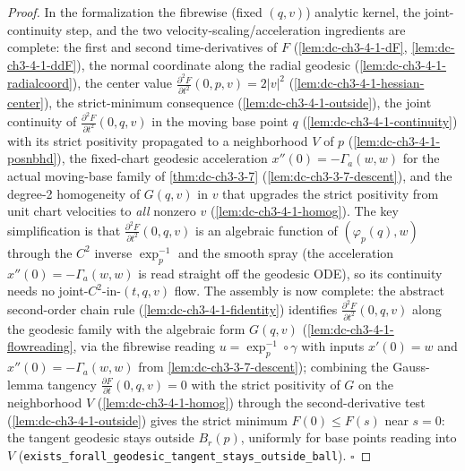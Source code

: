 \begin{proof}
  In the formalization the fibrewise (fixed $(q,v)$) analytic kernel, the
  joint-continuity step, and the two velocity-scaling/acceleration ingredients are
  complete: the first and second time-derivatives of $F$
  (\cref{lem:dc-ch3-4-1-dF}, \cref{lem:dc-ch3-4-1-ddF}), the normal coordinate
  along the radial geodesic (\cref{lem:dc-ch3-4-1-radialcoord}), the center value
  $\frac{\partial^2 F}{\partial t^2}(0,p,v)=2|v|^2$
  (\cref{lem:dc-ch3-4-1-hessian-center}), the strict-minimum consequence
  (\cref{lem:dc-ch3-4-1-outside}), the joint continuity
  of $\frac{\partial^2 F}{\partial t^2}(0,q,v)$ in the moving base point $q$
  (\cref{lem:dc-ch3-4-1-continuity}) with its strict positivity propagated to a
  neighborhood $V$ of $p$ (\cref{lem:dc-ch3-4-1-posnbhd}), the fixed-chart geodesic
  acceleration $x''(0)=-\Gamma_a(w,w)$ for the actual moving-base family of
  \cref{thm:dc-ch3-3-7} (\cref{lem:dc-ch3-3-7-descent}), and the degree-2 homogeneity
  of $G(q,v)$ in $v$ that upgrades the strict positivity from unit chart velocities to
  \emph{all} nonzero $v$ (\cref{lem:dc-ch3-4-1-homog}). The key simplification is
  that $\frac{\partial^2 F}{\partial t^2}(0,q,v)$ is an algebraic function of
  $(\varphi_p(q),w)$ through the $C^2$ inverse $\exp_p^{-1}$ and the smooth spray
  (the acceleration $x''(0)=-\Gamma_a(w,w)$ is read straight off the geodesic ODE), so
  its continuity needs no joint-$C^2$-in-$(t,q,v)$ flow. The assembly is now complete:
  the abstract second-order chain rule (\cref{lem:dc-ch3-4-1-fidentity}) identifies
  $\frac{\partial^2 F}{\partial t^2}(0,q,v)$ along the geodesic family with the algebraic
  form $G(q,v)$ (\cref{lem:dc-ch3-4-1-flowreading}, via the fibrewise reading
  $u=\exp_p^{-1}\circ\gamma$ with inputs $x'(0)=w$ and $x''(0)=-\Gamma_a(w,w)$ from
  \cref{lem:dc-ch3-3-7-descent}); combining the Gauss-lemma tangency
  $\frac{\partial F}{\partial t}(0,q,v)=0$ with the strict positivity of $G$ on the
  neighborhood $V$ (\cref{lem:dc-ch3-4-1-homog}) through the second-derivative test
  (\cref{lem:dc-ch3-4-1-outside}) gives the strict minimum $F(0)\le F(s)$ near $s=0$: the
  tangent geodesic stays outside $B_r(p)$, uniformly for base points reading into $V$
  (\texttt{exists\_forall\_geodesic\_tangent\_stays\_outside\_ball}). $\square$
\end{proof}

